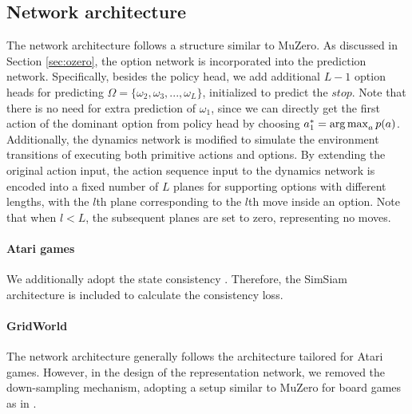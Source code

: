 \subsection{Network architecture}
The network architecture follows a structure similar to MuZero.
As discussed in Section \ref{sec:ozero}, the option network is incorporated into the prediction network.
Specifically, besides the policy head, we add additional $L-1$ option heads for predicting $\Omega=\{\omega_2,\omega_3,...,\omega_L\}$, initialized to predict the $stop$.
Note that there is no need for extra prediction of $\omega_1$, since we can directly get the first action of the dominant option from policy head by choosing $a^*_1=\operatorname*{arg\,max}_a p(a)$.
Additionally, the dynamics network is modified to simulate the environment transitions of executing both primitive actions and options.
By extending the original action input, the action sequence input to the dynamics network is encoded into a fixed number of $L$ planes for supporting options with different lengths, with the $l$th plane corresponding to the $l$th move inside an option.
Note that when $l<L$, the subsequent planes are set to zero, representing no moves.

\paragraph{Atari games}
We additionally adopt the state consistency \cite{ye_mastering_2021}.
Therefore, the SimSiam \cite{chen_exploring_2021} architecture is included to calculate the consistency loss.

\paragraph{GridWorld}
The network architecture generally follows the architecture tailored for Atari games.
However, in the design of the representation network, we removed the down-sampling mechanism, adopting a setup similar to MuZero for board games as in \citet{wu_minizero_2024}.

